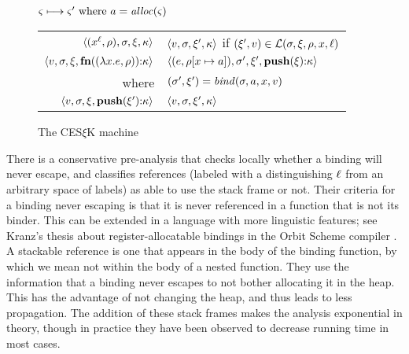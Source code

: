 \begin{figure}
  \centering
  $\mstate \stepto \mstate' \text{ where } \maddr = \alloc(\mstate)$ \\
  \begin{tabular}{r|l}
    \hline
    $\tpl{(\svar[\mlab]{\mvar}, \menv), \mstore, \mframe, \mkont}$
    &
    $\tpl{\mval,\mstore,\mframe',\mkont}$ if $(\mframe', \mval) \in \lookup(\mstore,\mframe,\menv,\mvar,\mlab)$
    \\
    $\tpl{\mval,\mstore,\mframe,\kcons{\kfn{\vclo{\slam{\mvar}{\mexpr}}{\menv}}}{\mkont}}$
    &
    $\tpl{(\mexpr, \extm{\menv}{\mvar}{\maddr}), \mstore', \mframe', \kcons{\kpush{\mframe}}{\mkont}}$
    \\ where & $(\mstore',\mframe') = \bind(\mstore,\maddr,\mvar,\mval)$
    \\
    $\tpl{\mval,\mstore,\mframe,\kcons{\kpush{\mframe'}}{\mkont}}$
    &
    $\tpl{\mval,\mstore,\mframe',\mkont}$
  \end{tabular}
  \caption{The CES$\xi$K machine}
  \label{fig:frame-semantics}
\end{figure}

%
There is a conservative pre-analysis that checks locally whether a binding will never escape, and classifies references (labeled with a distinguishing $\mlab$ from an arbitrary space of labels) as able to use the stack frame or not.
%
Their criteria for a binding never escaping is that it is never referenced in a function that is not its binder.
%
This can be extended in a language with more linguistic features; see Kranz's thesis about register-allocatable bindings in the Orbit Scheme compiler \citep{ianjohnson:kranz:thesis:1988}.
%
A stackable reference is one that appears in the body of the binding function, by which we mean not within the body of a nested function.
%
They use the information that a binding never escapes to not bother allocating it in the heap.
%
This has the advantage of not changing the heap, and thus leads to less propagation.
%
The addition of these stack frames makes the analysis exponential in theory, though in practice they have been observed to decrease running time in most cases.

